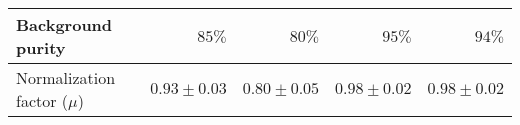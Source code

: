 \begin{tabular}{lrrrr}
\hline
Background purity & $85\%$ & $80\%$ & $95\%$ & $94\%$ \\
\hline
Normalization factor ($\mu$) & $0.93 \pm 0.03$ & $0.80 \pm 0.05$ & $0.98 \pm 0.02$ & $0.98 \pm 0.02$ \\
\hline

\end{tabular}
